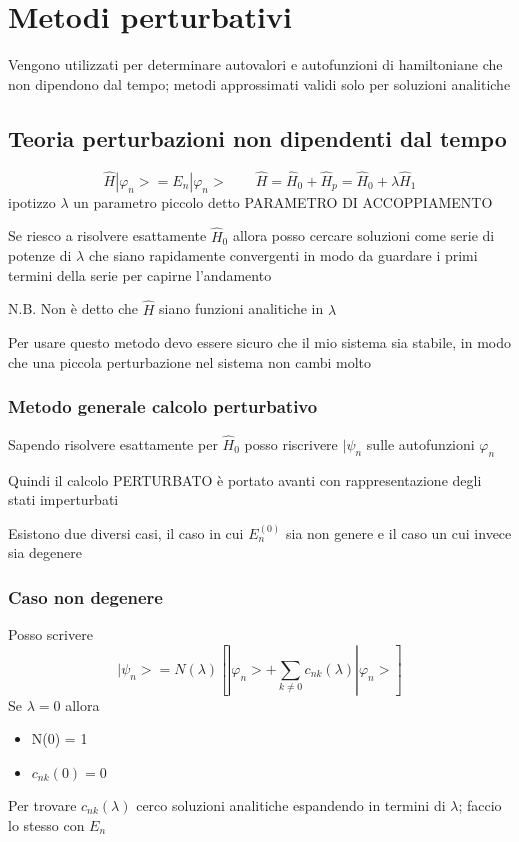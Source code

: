 \chapter{Metodi perturbativi}

Vengono utilizzati per determinare autovalori e autofunzioni di hamiltoniane che non dipendono dal tempo; metodi approssimati validi solo per soluzioni analitiche 

\section{Teoria perturbazioni non dipendenti dal tempo}

\begin{equation*}
    \hat{H} |\varphi_n> = E_n |\varphi_n> \qquad  \hat{H} = \hat{H}_0 + \hat{H}_p = \hat{H}_0 + \lambda \hat{H}_1
\end{equation*}
ipotizzo \(\lambda\) un parametro piccolo detto PARAMETRO DI ACCOPPIAMENTO

\noindent Se riesco a risolvere esattamente \(\hat{H}_0\) allora posso cercare soluzioni come serie di potenze di \(\lambda\) che siano rapidamente convergenti in modo da guardare i primi termini della serie per capirne l'andamento

\noindent N.B. \; Non è detto che \(\hat{H}\) siano funzioni analitiche in \(\lambda\)

\noindent Per usare questo metodo devo essere sicuro che il mio sistema sia stabile, in modo che una piccola perturbazione nel sistema non cambi molto

\subsection{Metodo generale calcolo perturbativo}

Sapendo risolvere esattamente per \(\hat{H}_0\) posso riscrivere \(|\psi_n\) sulle autofunzioni \(\varphi_n\)

\noindent Quindi il calcolo PERTURBATO è portato avanti con rappresentazione degli stati imperturbati

\noindent Esistono due diversi casi, il caso in cui \(E^{(0)}_n\) sia non genere e il caso un cui invece sia degenere

\subsection{Caso non degenere}

Posso scrivere 
\begin{equation*}
    |\psi_n> = N(\lambda)\left[|\varphi_n> + \sum_{k \neq 0 }c_{nk}(\lambda)|\varphi_n>\right]
\end{equation*}
Se \(\lambda = 0\) allora
\begin{itemize}
    \item N(0) = 1
    \item \(c_{nk}(0)=0\)
\end{itemize}
Per trovare \(c_{nk}(\lambda)\) cerco soluzioni analitiche espandendo in termini di \(\lambda\); faccio lo stesso con \(E_n\)

